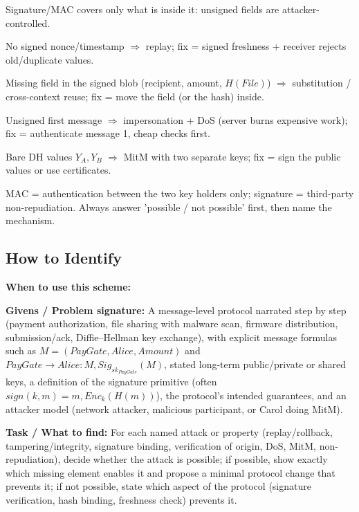 \documentclass[12pt, a4paper]{article}
\begin{document}
\begin{theorybox}
\begin{tightitem}
    \item Signature/MAC covers only what is inside it: unsigned fields are attacker-controlled.
    \item No signed nonce/timestamp $\Rightarrow$ replay; fix = signed freshness + receiver rejects old/duplicate values.
    \item Missing field in the signed blob (recipient, amount, $H(File)$) $\Rightarrow$ substitution / cross-context reuse; fix = move the field (or the hash) inside.
    \item Unsigned first message $\Rightarrow$ impersonation + DoS (server burns expensive work); fix = authenticate message 1, cheap checks first.
    \item Bare DH values $Y_A, Y_B$ $\Rightarrow$ MitM with two separate keys; fix = sign the public values or use certificates.
    \item MAC = authentication between the two key holders only; signature = third-party non-repudiation. Always answer 'possible / not possible' first, then name the mechanism.
\end{tightitem}
\end{theorybox}

\subsection*{How to Identify}

\textbf{When to use this scheme:}

\textbf{Givens / Problem signature:}
A message-level protocol narrated step by step (payment authorization, file sharing with malware scan, firmware distribution, submission/ack, Diffie--Hellman key exchange), with explicit message formulas such as $M = (PayGate, Alice, Amount)$ and $PayGate \to Alice : M, Sig_{sk_{PayGate}}(M)$, stated long-term public/private or shared keys, a definition of the signature primitive (often $sign(k, m) = m, Enc_k(H(m))$), the protocol's intended guarantees, and an attacker model (network attacker, malicious participant, or Carol doing MitM).

\textbf{Task / What to find:}
For each named attack or property (replay/rollback, tampering/integrity, signature binding, verification of origin, DoS, MitM, non-repudiation), decide whether the attack is possible; if possible, show exactly which missing element enables it and propose a minimal protocol change that prevents it; if not possible, state which aspect of the protocol (signature verification, hash binding, freshness check) prevents it.
\end{document}
